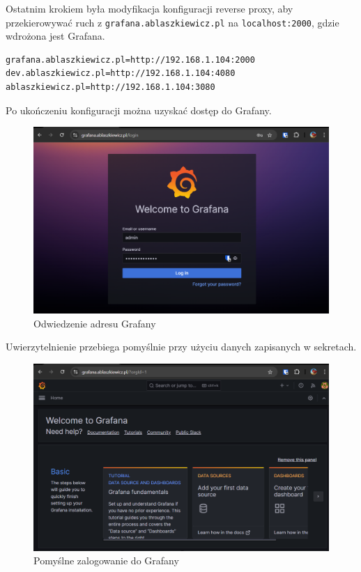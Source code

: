 \documentclass{article}
\begin{document}
Ostatnim krokiem była modyfikacja konfiguracji reverse proxy, aby przekierowywać ruch z \lstinline|grafana.ablaszkiewicz.pl| na \lstinline|localhost:2000|, gdzie wdrożona jest Grafana.

\begin{lstlisting}[caption=Zaktualizowany plik \texttt{infrastructure/reverse-proxy-shared/config}]
grafana.ablaszkiewicz.pl=http://192.168.1.104:2000
dev.ablaszkiewicz.pl=http://192.168.1.104:4080
ablaszkiewicz.pl=http://192.168.1.104:3080
\end{lstlisting}

Po ukończeniu konfiguracji można uzyskać dostęp do Grafany.

\begin{figure}[H]
    \centering
    \includegraphics[width=0.75\linewidth]{grafanaLogowanie.png}
    \caption{Odwiedzenie adresu Grafany}
    \label{fig:enter-label}
\end{figure}

Uwierzytelnienie przebiega pomyślnie przy użyciu danych zapisanych w sekretach.

\begin{figure}[H]
    \centering
    \includegraphics[width=0.75\linewidth]{grafanaPomyslneZalogowanie.png}
    \caption{Pomyślne zalogowanie do Grafany}
    \label{fig:enter-label}
\end{figure}
\end{document}
